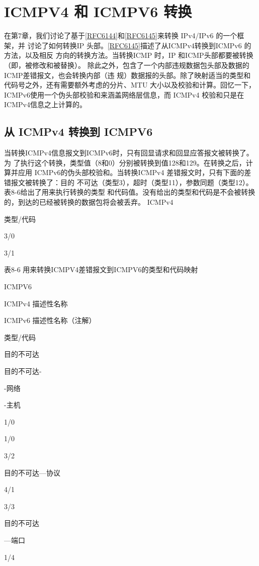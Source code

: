 \section{ICMPV4 和 ICMPV6 转换}
在第7章，我们讨论了基于\href{https://www.rfc-editor.org/rfc/rfc6144}{[RFC6144]}和\href{https://www.rfc-editor.org/rfc/rfc6145}{[RFC6145]}来转换 IPv4/IPv6 的一个框架，并
讨论了如何转换IP 头部。\href{https://www.rfc-editor.org/rfc/rfc6145}{[RFC6145]}描述了从ICMPv4转换到ICMPv6 的方法，以及相反
方向的转换方法。当转换ICMP 时，IP 和ICMP头部都要被转换（即，被修改和被替换）。
除此之外，包含了一个内部违规数据包头部及数据的ICMP差错报文，也会转换内部（违
规）数据报的头部。除了映射适当的类型和代码号之外，还有需要额外考虑的分片、MTU
大小以及校验和计算。回忆一下，ICMPv6使用一个伪头部校验和来涵盖网络层信息，而
ICMPv4 校验和只是在ICMPv4信息之上计算的。

\subsection{从 ICMPv4 转换到 ICMPV6}
当转换ICMPv4信息报文到ICMPv6时，只有回显请求和回显应答报文被转换了。为
了执行这个转换，类型值（8和0）分别被转换到值128和129。在转换之后，计算并应用
ICMPv6的伪头部校验和。当转换ICMPv4 差错报文时，只有下面的差错报文被转换了：目的
不可达（类型3），超时（类型11），参数同题（类型12）。表8-6给出了用来执行转换的类型
和代码值。没有给出的类型和代码是不会被转换的，到达的已经被转换的数据包将会被丢弃。
ICMPv4

类型/代码

3/0

3/1

表8-6 用来转换ICMPV4差错报文到ICMPV6的类型和代码映射

ICMPV6

ICMPv4 描述性名称

ICMPv6 描述性名称（注解）

类型/代码

目的不可达

目的不可达-

-网络

-主机

1/0

1/0

3/2

目的不可达—协议

4/1

3/3

目的不可达

—端口

1/4

